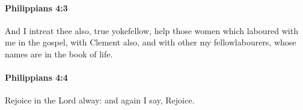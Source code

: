 		\paragraph{Philippians 4:3} %
			\label{PHILIPPIANS-4-3}

			And I intreat thee also, true yokefellow, help those women which laboured with me in the gospel, with Clement also, and with other my fellowlabourers, whose names are in the book of life.

			\begin{framed}
			\scriptsize
				\begin{compactdesc}
					\item[SBLG] 
				\end{compactdesc}
			\end{framed}

		\paragraph{Philippians 4:4} %
			\label{PHILIPPIANS-4-4}

			Rejoice in the Lord alway: and again I say, Rejoice.


